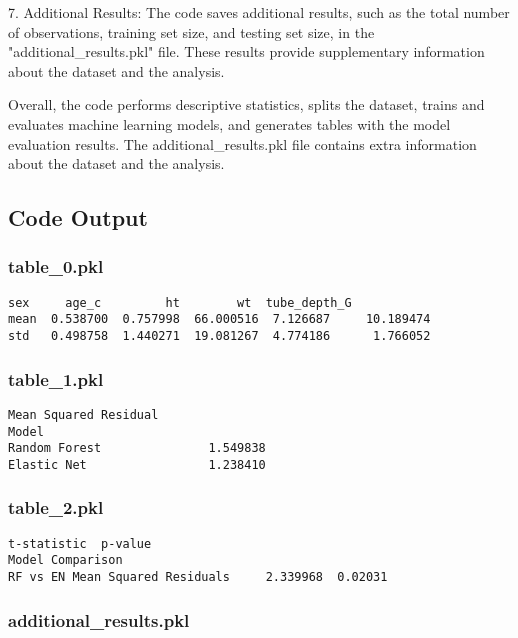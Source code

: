 \documentclass[11pt]{article}
\begin{document}
7. Additional Results: The code saves additional results, such as the total number of observations, training set size, and testing set size, in the "additional\_results.pkl" file. These results provide supplementary information about the dataset and the analysis.

Overall, the code performs descriptive statistics, splits the dataset, trains and evaluates machine learning models, and generates tables with the model evaluation results. The additional\_results.pkl file contains extra information about the dataset and the analysis.

\subsection{Code Output}

\subsubsection*{table\_0.pkl}

\begin{Verbatim}[tabsize=4]
           sex     age_c         ht        wt  tube_depth_G
mean  0.538700  0.757998  66.000516  7.126687     10.189474
std   0.498758  1.440271  19.081267  4.774186      1.766052
\end{Verbatim}

\subsubsection*{table\_1.pkl}

\begin{Verbatim}[tabsize=4]
               Mean Squared Residual
Model
Random Forest               1.549838
Elastic Net                 1.238410
\end{Verbatim}

\subsubsection*{table\_2.pkl}

\begin{Verbatim}[tabsize=4]
                                 t-statistic  p-value
Model Comparison
RF vs EN Mean Squared Residuals     2.339968  0.02031
\end{Verbatim}

\subsubsection*{additional\_results.pkl}
\end{document}
